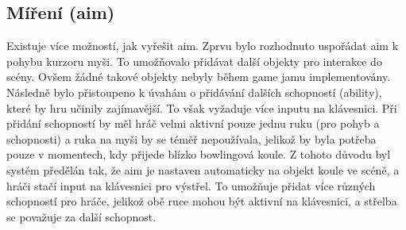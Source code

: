 \subsection{Míření (aim)}

Existuje více možností, jak vyřešit aim. Zprvu bylo rozhodnuto uspořádat aim k pohybu kurzoru myši. To umožňovalo přidávat další objekty pro interakce do scény. Ovšem žádné takové objekty nebyly během game jamu implementovány. Následně bylo přistoupeno k úvahám o přidávání dalších schopností (ability), které by hru učinily zajímavější. To však vyžaduje více inputu na klávesnici. Při přidání schopností by měl hráč velmi aktivní pouze jednu ruku (pro pohyb a schopnosti) a ruka na myši by se téměř nepoužívala, jelikož by byla potřeba pouze v momentech, kdy přijede blízko bowlingová koule. Z tohoto důvodu byl systém předělán tak, že aim je nastaven automaticky na objekt koule ve scéně, a hráči stačí input na klávesnici pro výstřel. To umožňuje přidat více různých schopností pro hráče, jelikož obě ruce mohou být aktivní na klávesnici, a střelba se považuje za další schopnost.